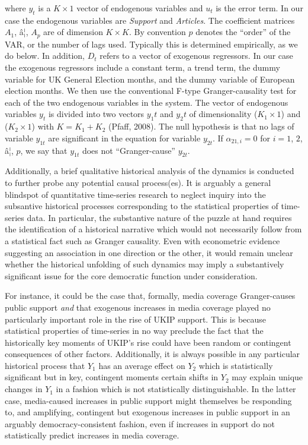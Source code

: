 \documentclass[12pt,article]{article}
\begin{document}
where \(y_t\) is a \(K \times 1\) vector of endogenous variables and
\(u_t\) is the error term. In our case the endogenous variables are
\emph{Support} and \emph{Articles}. The coefficient matrices \(A_1\),
â¦, \(A_p\) are of dimension \(K \times K\). By convention \(p\)
denotes the ``order'' of the VAR, or the number of lags used. Typically
this is determined empirically, as we do below. In addition, \(D_t\)
refers to a vector of exogenous regressors. In our case the exogenous
regressors include a constant term, a trend term, the dummy variable for
UK General Election months, and the dummy variable of European election
months. We then use the conventional F-type Granger-causality test for
each of the two endogenous variables in the system. The vector of
endogenous variables \(y_t\) is divided into two vectors \(y_1t\) and
\(y_2t\) of dimensionality (\(K_1 \times 1\)) and (\(K_2 \times 1\))
with \(K = K_1 + K_2\) (Pfaff, 2008). The null hypothesis is that no
lags of variable \(y_{1t}\) are significant in the equation for variable
\({y}_{2t}\). If \(\alpha_{21, i} = 0\) for \(i = 1\), \(2\), â¦,
\(p\), we say that \(y_{1t}\) does not ``Granger-cause'' \(y_{2t}\).

Additionally, a brief qualitative historical analysis of the dynamics is
conducted to further probe any potential causal process(es). It is
arguably a general blindspot of quantitative time-series research to
neglect inquiry into the subsantive historical processes corresponding
to the statistical properties of time-series data. In particular, the
substantive nature of the puzzle at hand requires the identification of
a historical narrative which would not necessarily follow from a
statistical fact such as Granger causality. Even with econometric
evidence suggesting an association in one direction or the other, it
would remain unclear whether the historical unfolding of such dynamics
may imply a substantively significant issue for the core democratic
function under consideration.

For instance, it could be the case that, formally, media coverage
Granger-causes public support \emph{and} that exogenous increases in
media coverage played no particularly important role in the rise of UKIP
support. This is because statistical properties of time-series in no way
preclude the fact that the historically key moments of UKIP's rise could
have been random or contingent consequences of other factors.
Additionally, it is always possible in any particular historical process
that \(Y_1\) has an average effect on \(Y_2\) which is statistically
significant but in key, contingent moments certain shifts in \(Y_2\) may
explain unique changes in \(Y_1\) in a fashion which is not
statistically distinguishable. In the latter case, media-caused
increases in public support might themselves be responding to, and
amplifying, contingent but exogenous increases in public support in an
arguably democracy-consistent fashion, even if increases in support do
not statistically predict increases in media coverage.
\end{document}
